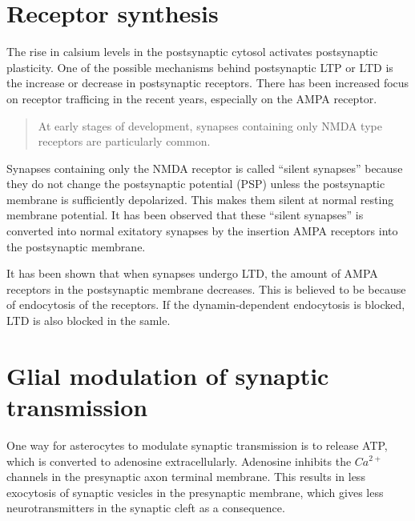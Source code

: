 
\section{Receptor synthesis}
The rise in calsium levels in the postsynaptic cytosol activates postsynaptic plasticity\cite{AMPARtrafficingArtikkel}. 
One of the possible mechanisms behind postsynaptic LTP or LTD is the increase or decrease in postsynaptic receptors. There has been increased focus on receptor trafficing in the recent years, especially on the AMPA receptor. 

\begin{quote}
At early stages of development, synapses containing only NMDA type receptors are particularly common\cite{PrinciplesOfNeuralScience4edKAP12}.
\end{quote}
Synapses containing only the NMDA receptor is called ``silent synapses'' because they do not change the postsynaptic potential (PSP) unless the postsynaptic membrane is sufficiently depolarized. 
This makes them silent at normal resting membrane potential\cite{AMPARtrafficingArtikkel}. 
It has been observed that these ``silent synapses'' is converted into normal exitatory synapses by the insertion AMPA receptors into the postsynaptic membrane\cite{AMPARtrafficingArtikkel}. 

It has been shown that when synapses undergo LTD, the amount of AMPA receptors in the postsynaptic membrane decreases\cite{AMPARtrafficingArtikkel}. 
This is believed to be because of endocytosis of the receptors. If the dynamin-dependent endocytosis is blocked, LTD is also blocked in the samle\cite{AMPARtrafficingArtikkel}.

\section{Glial modulation of synaptic transmission}
One way for asterocytes to modulate synaptic transmission is to release ATP, which is converted to adenosine extracellularly. 
Adenosine inhibits the $Ca^{2+}$ channels in the presynaptic axon terminal membrane\cite{signallingBetweenGlialAndNeuronsInSynPlast}. 
This results in less exocytosis of synaptic vesicles in the presynaptic membrane, which gives less neurotransmitters in the synaptic cleft as a consequence\cite{signallingBetweenGlialAndNeuronsInSynPlast}.

